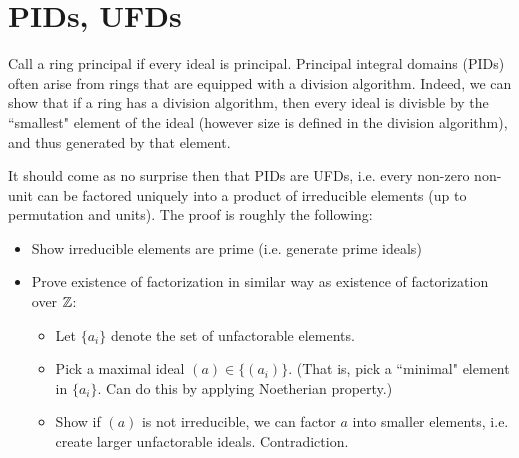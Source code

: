 \section{PIDs, UFDs}
Call a ring principal if every ideal is principal. Principal integral domains (PIDs) often arise from rings that are equipped with a division algorithm. Indeed, we can show that if a ring has a division algorithm, then every ideal is divisble by the ``smallest" element of the ideal (however size is defined in the division algorithm), and thus generated by that element.

It should come as no surprise then that PIDs are UFDs, i.e. every non-zero non-unit can be factored uniquely into a product of irreducible elements (up to permutation and units). The proof is roughly the following:
\begin{itemize}
    \item Show irreducible elements are prime (i.e. generate prime ideals)
    \item Prove existence of factorization in similar way as existence of factorization over ${\mathbb Z}$:
        \begin{itemize}
            \item Let $\{a_i\}$ denote the set of unfactorable elements.
            \item Pick a maximal ideal $(a) \in \{(a_i)\}$. (That is, pick a ``minimal" element in $\{a_i\}$. Can do this by applying Noetherian property.)
            \item Show if $(a)$ is not irreducible, we can factor $a$ into smaller elements, i.e. create larger unfactorable ideals. Contradiction.
        \end{itemize}
\end{itemize}
